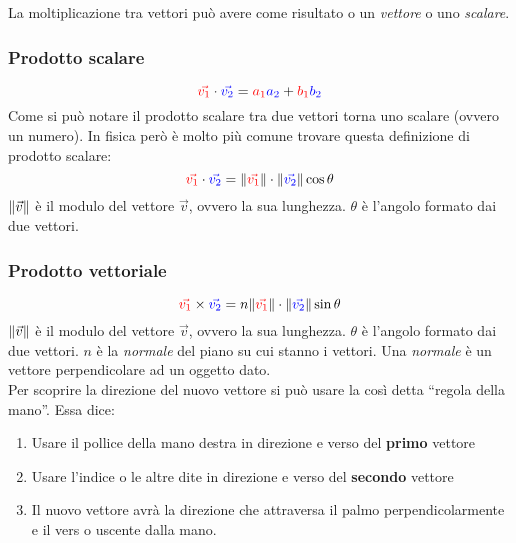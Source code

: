 La moltiplicazione tra vettori può avere come risultato o un \emph{vettore} o uno \emph{scalare}.

\subsubsection{Prodotto scalare}
\begin{equation*}
\mathcolor{red}{\vec{v_1}} \cdot \mathcolor{blue}{\vec{v_2}} = 
\mathcolor{red}{a_1}\mathcolor{blue}{a_2} + \mathcolor{red}{b_1}\mathcolor{blue}{b_2}
\end{equation*}
Come si può notare il prodotto scalare tra due vettori torna uno scalare (ovvero un numero).
In fisica però è molto più comune trovare questa definizione di prodotto scalare:
\begin{equation*}
\mathcolor{red}{\vec{v_1}} \cdot \mathcolor{blue}{\vec{v_2}} =
\norm{\mathcolor{red}{\vec{v_1}}}\cdot\norm{\mathcolor{blue}{\vec{v_2}}}\cos\theta
\end{equation*}
$\lVert\vec{v}\rVert$ è il modulo del vettore $\vec{v}$, ovvero la sua lunghezza. $\theta$ è l'angolo
formato dai due vettori.

\subsubsection{Prodotto vettoriale}\label{subsec:vettori:prodottoVettoriale}
\begin{equation*}
\mathcolor{red}{\vec{v_1}} \times \mathcolor{blue}{\vec{v_2}} =
n\norm{\mathcolor{red}{\vec{v_1}}}\cdot\norm{\mathcolor{blue}{\vec{v_2}}}\sin\theta
\end{equation*}
$\lVert\vec{v}\rVert$ è il modulo del vettore $\vec{v}$, ovvero la sua lunghezza. $\theta$ è l'angolo
formato dai due vettori. $n$ è la \emph{normale} del piano su cui stanno i vettori. Una \emph{normale}
è un vettore perpendicolare ad un oggetto dato.\\
Per scoprire la direzione del nuovo vettore si può usare la così detta ``regola della mano''. Essa 
dice:
\begin{enumerate}
	\item Usare il pollice della mano destra in direzione e verso del \textbf{primo} vettore
	\item Usare l'indice o le altre dite in direzione e verso del \textbf{secondo} vettore
	\item Il nuovo vettore avrà la direzione che attraversa il palmo perpendicolarmente e il vers
          o uscente dalla mano.
\end{enumerate}

